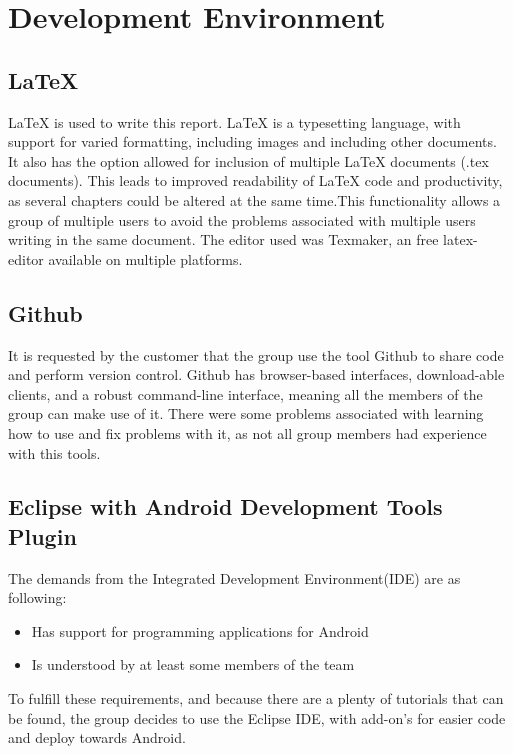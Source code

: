 \chapter{Development Environment}

\section{LaTeX}
LaTeX is used to write this report. LaTeX is a typesetting language, with support for varied formatting, including images and including other documents. It also has the option allowed for inclusion of multiple LaTeX documents (.tex documents). This leads to improved readability of LaTeX code and productivity, as several chapters could be altered at the same time.This functionality allows a group of multiple users to avoid the problems associated with multiple users writing in the same document. The editor used was Texmaker, an free latex-editor available on multiple platforms.
\section{Github}

\label{def:githubDev}It is requested by the customer that the group use the tool Github to share code and perform version control. Github has browser-based interfaces, download-able clients, and a robust command-line interface, meaning all the members of the group can make use of it. There were some problems associated with learning how to use and fix problems with it, as not all group members had experience with this tools. 

\section{Eclipse with Android Development Tools Plugin}
The demands from the Integrated Development Environment(IDE) are as following:
\begin{itemize}
\item Has support for programming applications for Android
\item Is understood by at least some members of the team
\end{itemize}
To fulfill these requirements, and because there are a plenty of tutorials that can be found, the group decides to use the Eclipse IDE, with add-on's for easier code and deploy towards Android. 


 
